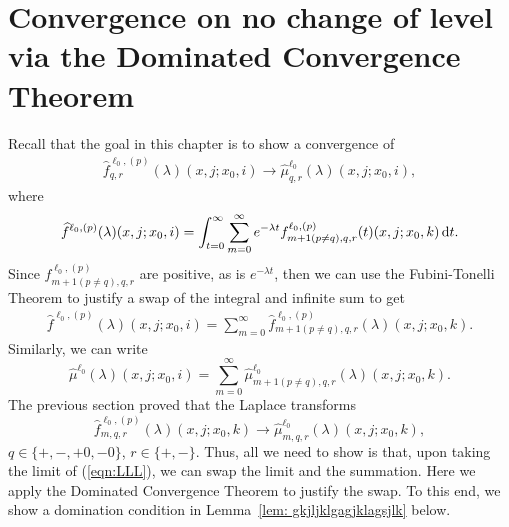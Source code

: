 \section{Convergence on no change of level via the Dominated Convergence Theorem}\label{sec: dom 1}
Recall that the goal in this chapter is to show a convergence of 
\begin{align*}
	\widehat f_{q,r}^{\ell_0,(p)}(\lambda)(x,j;x_0,i) 
\to
	\widehat \mu_{q,r}^{\ell_0}(\lambda)(x,j;x_0,i),
\end{align*} 
where 
\[\widehat f^{\ell_0,(p)}(\lambda)(x,j;x_0,i)= \int_{t=0}^\infty \sum\limits_{m=0}^\infty e^{-\lambda t} f_{m+1(p\neq q),q,r}^{\ell_0,(p)}(t)(x,j;x_0,k)\, \mathrm{d} t.\] 
Since \(f_{m+1(p\neq q),q,r}^{\ell_0,(p)}\) are positive, as is \(e^{-\lambda t}\), then we can use the Fubini-Tonelli Theorem to justify a swap of the integral and infinite sum to get 
\begin{align}
	\widehat f^{\ell_0,(p)}(\lambda)(x,j;x_0,i)=  \sum\limits_{m=0}^\infty \widehat f_{m+1(p\neq q),q,r}^{\ell_0,(p)}(\lambda)(x,j;x_0,k).\label{eqn:LLL}
\end{align}
Similarly, we can write 
\[\widehat \mu^{\ell_0}(\lambda)(x,j;x_0,i)=  \sum\limits_{m=0}^\infty \widehat \mu_{m+1(p\neq q),q,r}^{\ell_0}(\lambda)(x,j;x_0,k).\] 
The previous section proved that the Laplace transforms 
\[\widehat f_{m,q,r}^{\ell_0,(p)}(\lambda)(x,j;x_0,k)\to\widehat \mu_{m,q,r}^{\ell_0}(\lambda)(x,j;x_0,k),\] 
\(q\in\{+,-,+0,-0\}\), \(r\in\{+,-\}\). Thus, all we need to show is that, upon taking the limit of (\ref{eqn:LLL}), we can swap the limit and the summation. Here we apply the Dominated Convergence Theorem to justify the swap. To this end, we show a domination condition in Lemma~\ref{lem: gkjljklgagjklagsjlk} below.

